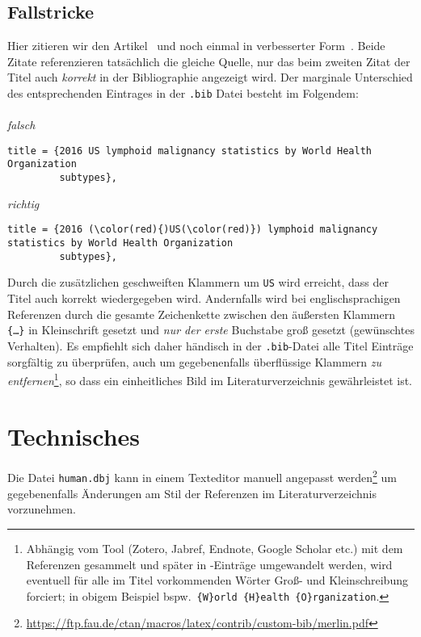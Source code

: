 \documentclass[a4paper,10pt]{scrartcl}
\renewcommand{\cite}{\citep}  %
\begin{document}
\subsection{Fallstricke}
Hier zitieren wir den Artikel~\cite{teras2016_FALSCH} und noch einmal in
verbesserter Form~\cite{teras2016_RICHTIG}. Beide Zitate referenzieren
tats\"achlich die gleiche Quelle, nur das beim zweiten Zitat der
Titel auch \emph{korrekt} in der Bibliographie angezeigt wird. Der
marginale Unterschied des entsprechenden Eintrages
in der \verb|.bib| Datei besteht im Folgendem:\\\\
\emph{falsch}
\begin{Verbatim}
title = {2016 US lymphoid malignancy statistics by World Health Organization
         subtypes},
\end{Verbatim}
\emph{richtig}
\begin{Verbatim}[commandchars=\\\(\)]
title = {2016 (\color(red){)US(\color(red)}) lymphoid malignancy statistics by World Health Organization
         subtypes},
\end{Verbatim}
Durch die zusätzlichen geschweiften Klammern um \texttt{US} wird erreicht, dass der Titel
auch korrekt wiedergegeben wird. Andernfalls wird bei englischsprachigen
Referenzen durch  die gesamte Zeichenkette zwischen den
\"au{\ss}ersten Klammern \texttt{\{\ldots \}} in Kleinschrift gesetzt und
\emph{nur der erste} Buchstabe gro{\ss} gesetzt (gewünschtes Verhalten). Es empfiehlt sich daher händisch in
der
\verb|.bib|-Datei alle Titel Einträge sorgfältig zu überprüfen, auch um
gegebenenfalls überflüssige Klammern \emph{zu entfernen}\footnote{Abhängig vom
Tool (Zotero, Jabref, Endnote, Google Scholar etc.) mit dem Referenzen gesammelt und später in -Einträge
umgewandelt werden, wird eventuell für alle im Titel vorkommenden Wörter
Gro{\ss}- und Kleinschreibung forciert; in obigem Beispiel bspw.\ \verb|{W}orld {H}ealth {O}rganization|.},
so dass ein einheitliches Bild im Literaturverzeichnis gewährleistet ist.

\section{Technisches}
Die Datei \verb|human.dbj| kann in einem Texteditor manuell angepasst
werden\footnote{%
\url{https://ftp.fau.de/ctan/macros/latex/contrib/custom-bib/merlin.pdf}} um
gegebenenfalls Änderungen am Stil der Referenzen im Literaturverzeichnis
vorzunehmen.
\end{document}
